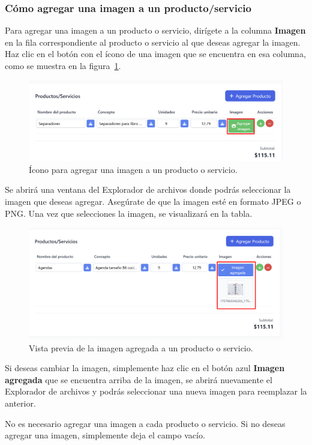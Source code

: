 \documentclass{Pretexto/bluereport}
\begin{document}
\subsubsection{Cómo agregar una imagen a un producto/servicio}
Para agregar una imagen a un producto o servicio, dirígete a la columna \textbf{Imagen} en la fila correspondiente al producto o servicio al 
que deseas agregar la imagen. Haz clic en el botón con el ícono de una imagen que se encuentra en esa columna, como se muestra en
 la figura~\ref{fig:icono_imagen}. 
\begin{figure}[H] 
    \centering
        \includegraphics[width=0.8\linewidth]{img/icono_imagen.png}
    \caption{Ícono para agregar una imagen a un producto o servicio.}
    \label{fig:icono_imagen}
\end{figure}
Se abrirá una ventana del Explorador de archivos donde podrás seleccionar la imagen que deseas agregar. Asegúrate de que la imagen esté en
formato JPEG o PNG. Una vez que selecciones la imagen, se visualizará en la tabla.
\begin{figure}[H] 
    \centering
        \includegraphics[width=0.8\linewidth]{img/imagen_agregada.png}
    \caption{Vista previa de la imagen agregada a un producto o servicio.}
    \label{fig:imagen_agregada}
\end{figure}
Si deseas cambiar la imagen, simplemente haz clic en el botón azul \textbf{Imagen agregada} que se encuentra arriba de la imagen, se 
abrirá nuevamente el Explorador de archivos y podrás seleccionar una nueva imagen para reemplazar la anterior.
\begin{importante}
No es necesario agregar una imagen a cada producto o servicio. Si no deseas agregar una imagen, simplemente deja el campo vacío.
\end{importante}
\end{document}
